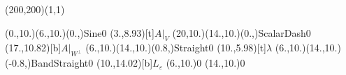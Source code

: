 \unitlength=1bp%

\begin{feynartspicture}(200,200)(1,1)

\FADiagram{}
\FAProp(0.,10.)(6.,10.)(0.,){Sine}{0}
\FALabel(3.,8.93)[t]{$A|_V$}
\FAProp(20,10.)(14.,10.)(0.,){ScalarDash}{0}
\FALabel(17.,10.82)[b]{$A|_{W^\perp}$}
\FAProp(6.,10.)(14.,10.)(0.8,){Straight}{0}
\FALabel(10.,5.98)[t]{$\lambda$}
\FAProp(6.,10.)(14.,10.)(-0.8,){BandStraight}{0}
\FALabel(10.,14.02)[b]{$L_\varepsilon$}
\FAVert(6.,10.){0}
\FAVert(14.,10.){0}
\end{feynartspicture}


